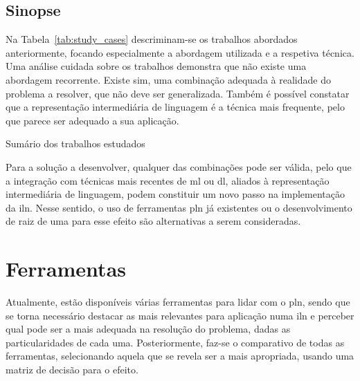 \subsection{Sinopse}
Na Tabela~\ref{tab:study_cases} descriminam-se os trabalhos abordados anteriormente, focando especialmente a abordagem utilizada e a respetiva técnica. Uma análise cuidada sobre os trabalhos demonstra que não existe uma abordagem recorrente. Existe sim, uma combinação adequada à realidade do problema a resolver, que não deve ser generalizada. Também é possível constatar que a representação intermediária de linguagem é a técnica mais frequente, pelo que parece ser adequado a sua aplicação.
%
\begin{table}
\caption{Sumário dos trabalhos estudados}
\label{tab:study_cases}
\centering
\resizebox{\textwidth}{!}{
\renewcommand{\arraystretch}{1.25}
\footnotesize

}
\end{table}

Para a solução a desenvolver, qualquer das combinações pode ser válida, pelo que a integração com técnicas mais recentes de \gls{ml} ou \gls{dl}, aliados à representação intermediária de linguagem, podem constituir um novo passo na implementação da \gls{iln}. Nesse sentido, o uso de ferramentas \gls{pln} já existentes ou o desenvolvimento de raiz de uma para esse efeito são alternativas a serem consideradas.

\section{Ferramentas}
\label{sec:chap03_existingtools}
Atualmente, estão disponíveis várias ferramentas para lidar com o \gls{pln}, sendo que se torna necessário destacar as mais relevantes para aplicação numa \gls{iln} e perceber qual pode ser a mais adequada na resolução do problema, dadas as particularidades de cada uma. Posteriormente, faz-se o comparativo de todas as ferramentas, selecionando aquela que se revela ser a mais apropriada, usando uma matriz de decisão para o efeito.

